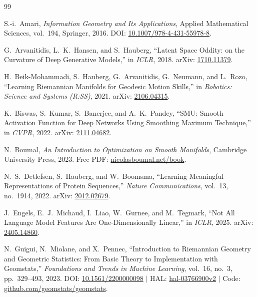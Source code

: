 \documentclass[11pt,a4paper]{article}
\theoremstyle{definition}
\begin{document}
\begin{thebibliography}{99}

S.-i.~Amari,
\emph{Information Geometry and Its Applications},
Applied Mathematical Sciences, vol.~194, Springer, 2016.
DOI: \href{https://doi.org/10.1007/978-4-431-55978-8}{10.1007/978-4-431-55978-8}.

G.~Arvanitidis, L.~K.~Hansen, and S.~Hauberg,
``Latent Space Oddity: on the Curvature of Deep Generative Models,''
in \emph{ICLR}, 2018.
arXiv: \href{https://arxiv.org/abs/1710.11379}{1710.11379}.

H.~Beik-Mohammadi, S.~Hauberg, G.~Arvanitidis, G.~Neumann, and L.~Rozo,
``Learning Riemannian Manifolds for Geodesic Motion Skills,''
in \emph{Robotics: Science and Systems (R:SS)}, 2021.
arXiv: \href{https://arxiv.org/abs/2106.04315}{2106.04315}.

K.~Biswas, S.~Kumar, S.~Banerjee, and A.~K.~Pandey,
``SMU: Smooth Activation Function for Deep Networks Using Smoothing Maximum Technique,''
in \emph{CVPR}, 2022.
arXiv: \href{https://arxiv.org/abs/2111.04682}{2111.04682}.

N.~Boumal,
\emph{An Introduction to Optimization on Smooth Manifolds},
Cambridge University Press, 2023.
Free PDF: \href{https://www.nicolasboumal.net/book/}{nicolasboumal.net/book}.

N.~S.~Detlefsen, S.~Hauberg, and W.~Boomsma,
``Learning Meaningful Representations of Protein Sequences,''
\emph{Nature Communications}, vol.~13, no.~1914, 2022.
arXiv: \href{https://arxiv.org/abs/2012.02679}{2012.02679}.

J.~Engels, E.~J.~Michaud, I.~Liao, W.~Gurnee, and M.~Tegmark,
``Not All Language Model Features Are One-Dimensionally Linear,''
in \emph{ICLR}, 2025.
arXiv: \href{https://arxiv.org/abs/2405.14860}{2405.14860}.

N.~Guigui, N.~Miolane, and X.~Pennec,
``Introduction to Riemannian Geometry and Geometric Statistics: From Basic Theory to Implementation with Geomstats,''
\emph{Foundations and Trends in Machine Learning}, vol.~16, no.~3, pp.~329--493, 2023.
DOI: \href{https://doi.org/10.1561/2200000098}{10.1561/2200000098} $\mid$
HAL: \href{https://inria.hal.science/hal-03766900v2}{hal-03766900v2} $\mid$
Code: \href{https://github.com/geomstats/geomstats}{github.com/geomstats/geomstats}.


\end{thebibliography}
\end{document}
